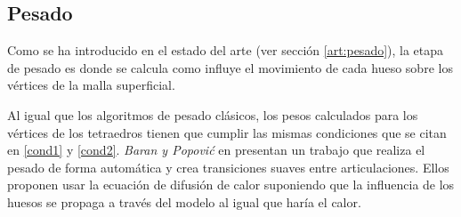 \subsection{Pesado}
\label{posing:Pesado}
%
Como se ha introducido en el estado del arte (ver sección \ref{art:pesado}), la etapa de pesado es donde se calcula como influye el movimiento de cada hueso sobre los vértices de la malla superficial. 


Al igual que los algoritmos de pesado clásicos, los pesos calculados para los vértices de los tetraedros tienen que cumplir las mismas condiciones que se citan en \ref{cond1} y \ref{cond2}.
\emph{Baran y Popovi\'{c}} en \cite{Baran:2007} presentan un trabajo que realiza el pesado de forma automática y crea transiciones suaves entre articulaciones. Ellos proponen usar la ecuación de difusión de calor suponiendo que la influencia de los huesos se propaga a través del modelo al igual que haría el calor. %


